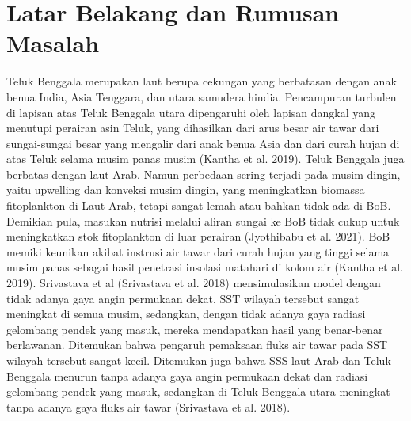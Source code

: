 \vspace{1.5pc}
\section[Latar Belakang dan Rumusan Masalah]{Latar Belakang dan Rumusan Masalah}
\begin{spacing}{1.5}
	Teluk Benggala merupakan laut berupa cekungan yang berbatasan dengan anak benua India, Asia Tenggara, dan utara samudera hindia. Pencampuran turbulen di lapisan atas Teluk Benggala utara dipengaruhi oleh lapisan dangkal yang menutupi perairan asin Teluk, yang dihasilkan dari arus besar air tawar dari sungai-sungai besar yang mengalir dari anak benua Asia dan dari curah hujan di atas Teluk selama musim panas musim (Kantha et al. 2019). Teluk Benggala juga berbatas dengan laut Arab. Namun perbedaan sering terjadi pada musim dingin, yaitu upwelling dan konveksi musim dingin, yang meningkatkan biomassa fitoplankton di Laut Arab, tetapi sangat lemah atau bahkan tidak ada di BoB. Demikian pula, masukan nutrisi melalui aliran sungai ke BoB tidak cukup untuk meningkatkan stok fitoplankton di luar perairan (Jyothibabu et al. 2021). BoB memiki keunikan akibat instrusi air tawar dari curah hujan yang tinggi selama musim panas sebagai hasil penetrasi insolasi matahari di kolom air (Kantha et al. 2019). Srivastava et al (Srivastava et al. 2018) mensimulasikan model dengan tidak adanya gaya angin permukaan dekat, SST wilayah tersebut sangat meningkat di semua musim, sedangkan, dengan tidak adanya gaya radiasi gelombang pendek yang masuk, mereka mendapatkan hasil yang benar-benar berlawanan. Ditemukan bahwa pengaruh pemaksaan fluks air tawar pada SST wilayah tersebut sangat kecil. Ditemukan juga bahwa SSS laut Arab dan Teluk Benggala menurun tanpa adanya gaya angin permukaan dekat dan radiasi gelombang pendek yang masuk, sedangkan di Teluk Benggala utara meningkat tanpa adanya gaya fluks air tawar (Srivastava et al. 2018).
	

\end{spacing}
